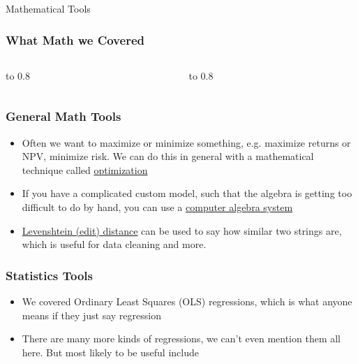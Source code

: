 \documentclass[handout, 11pt]{beamer}
\begin{document}
\begin{section}{Mathematical Tools}
\begin{frame}
\frametitle{What Math we Covered}
\begin{columns}
\begin{column}{0.5\textwidth}
\vbox to 0.8
\end{column}
\begin{column}{0.5\textwidth}
\vbox to 0.8
\end{column}
\end{columns}
\end{frame}
\begin{frame}
\frametitle{General Math Tools}
\begin{itemize}
\item Often we want to maximize or minimize something, e.g. maximize returns or NPV, minimize risk. We can do this in general with a mathematical technique called
\underline{optimization}
\vfill
\item If you have a complicated custom model, such that the algebra is getting too difficult to do by hand, you can use a
\underline{computer algebra system}
\vfill
\item \underline{Levenshtein (edit) distance}
can be used to say how similar two strings are,
which is useful for data cleaning and more.
\end{itemize}
\end{frame}
\begin{frame}
\frametitle{Statistics Tools}
\begin{itemize}
\item We covered Ordinary Least Squares (OLS) regressions, which is what anyone means if they just say regression
\vfill
\item There are many more kinds of regressions, we can't even mention them all here. But most likely to be useful include

\end{itemize}
\end{frame}
\end{section}
\end{document}
